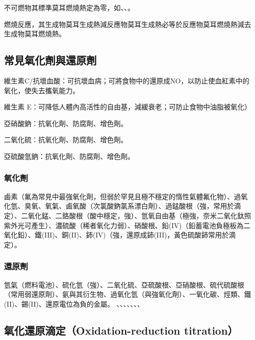\documentclass[a4paper,12pt]{article}
\begin{document}
不可燃物其標準莫耳燃燒熱定為零，如、、。

燃燒反應，其生成物莫耳生成熱減反應物莫耳生成熱必等於反應物莫耳燃燒熱減去生成物莫耳燃燒熱。
\subsection{常見氧化劑與還原劑}
\bit
\item 維生素C/抗壞血酸：可抗壞血病；可將食物中的還原成NO，以防止使血紅素中的氧化，使失去攜氧能力。
\item 維生素 E：可降低人體內高活性的自由基，減緩衰老；可防止食物中油脂被氧化）
\item 亞硝酸鈉：抗氧化劑、防腐劑、增色劑。
\item 二氧化硫：抗氧化劑、防腐劑、增色劑。
\item 亞硫酸氫鈉：抗氧化劑、防腐劑、增色劑。
\eit
\subsubsection{氧化劑}
鹵素（氟為常見中最強氧化劑，但弱於罕見且極不穩定的惰性氣體氟化物）、過氧化氫、臭氧、氧氣、鹵氧酸（次氯酸鈉氯系漂白劑）、過錳酸根（強，常用於滴定）、二氧化錳、二鉻酸根（酸中穩定，強）、氫氧自由基（極強，奈米二氧化鈦照紫外光可產生）、濃硫酸（稀者氧化力弱）、硝酸根、鉛(IV)（鉛蓄電池負極板為二氧化鉛）、鐵(III)、銅(II)、鈰(IV)（強，還原成鈰(III)，黃色硫酸鈰常用於滴定）。
\subsubsection{還原劑}
氫氣（燃料電池）、硫化氫（強）、二氧化硫、亞硫酸根、亞硝酸根、硫代硫酸根（常用弱還原劑）、氨與其衍生物、過氧化氫（與強氧化劑）、一氧化碳、烴類、鐵(II)、錫(II)、還原電位為負的金屬。
、、、、、、、
\subsection{氧化還原滴定（Oxidation-reduction titration）}
\end{document}

